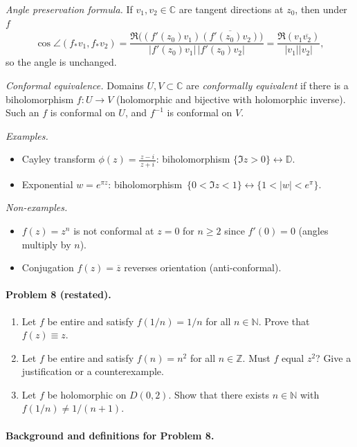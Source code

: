 \documentclass[11pt,a4paper]{article}
\theoremstyle{definition}
\theoremstyle{definition}
\theoremstyle{plain}
\theoremstyle{remark}
\begin{document}
\emph{Angle preservation formula.}
If $v_1,v_2\in\mathbb C$ are tangent directions at $z_0$, then under $f$
\[
\cos\angle(f_*v_1,f_*v_2)
=\frac{\Re\big((f'(z_0)v_1)\overline{(f'(z_0)v_2)}\big)}{|f'(z_0)v_1|\,|f'(z_0)v_2|}
=\frac{\Re(v_1\overline{v_2})}{|v_1||v_2|},
\]
so the angle is unchanged.

\emph{Conformal equivalence.}
Domains $U,V\subset\mathbb C$ are \emph{conformally equivalent} if there is a biholomorphism $f:U\to V$ (holomorphic and bijective with holomorphic inverse). Such an $f$ is conformal on $U$, and $f^{-1}$ is conformal on $V$.

\emph{Examples.}
\begin{itemize}
	\item Cayley transform $\displaystyle \phi(z)=\frac{z-i}{\,z+i\,}$: biholomorphism $\{\Im z>0\}\leftrightarrow\mathbb D$.
	\item Exponential $\displaystyle w=e^{\pi z}$: biholomorphism $\,\{0<\Im z<1\}\leftrightarrow \{1<|w|<e^{\pi}\}$.
\end{itemize}

\emph{Non-examples.}
\begin{itemize}
	\item $f(z)=z^n$ is not conformal at $z=0$ for $n\ge 2$ since $f'(0)=0$ (angles multiply by $n$).
	\item Conjugation $f(z)=\overline z$ reverses orientation (anti-conformal).
\end{itemize}

\paragraph{Problem 8 (restated).}
\begin{enumerate}[label=(\roman*)]
	\item Let $f$ be entire and satisfy $f(1/n)=1/n$ for all $n\in\mathbb N$. Prove that $f(z)\equiv z$.
	\item Let $f$ be entire and satisfy $f(n)=n^{2}$ for all $n\in\mathbb Z$. Must $f$ equal $z^{2}$? Give a justification or a counterexample.
	\item Let $f$ be holomorphic on $D(0,2)$. Show that there exists $n\in\mathbb N$ with $f(1/n)\ne 1/(n+1)$.
\end{enumerate}

\medskip
\paragraph{Background and definitions for Problem 8.}
\end{document}
